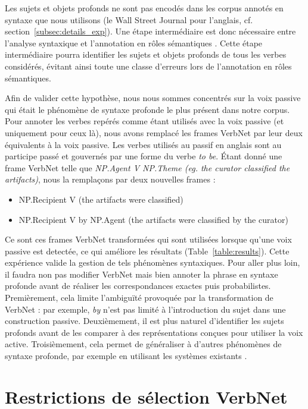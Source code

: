 Les sujets et objets profonds ne sont pas encodés dans les corpus annotés en
syntaxe que nous utilisons (le Wall Street Journal pour l'anglais, cf.
section~\ref{subsec:details_exp}). Une étape intermédiaire est donc nécessaire
entre l'analyse syntaxique et l'annotation en rôles sémantiques
\citep{bonfante2011modular, ribeyre2013systeme}. Cette étape intermédiaire
pourra identifier les sujets et objets profonds de tous les verbes considérés,
évitant ainsi toute une classe d'erreurs lors de l'annotation en rôles
sémantiques. 

Afin de valider cette hypothèse, nous nous sommes concentrés sur la voix
passive qui était le phénomène de syntaxe profonde le plus présent dans notre
corpus.  Pour annoter les verbes repérés comme étant utilisés avec la voix
passive (et uniquement pour ceux là), nous avons remplacé les frames VerbNet
par leur deux équivalents à la voix passive. Les verbes utilisés au passif en
anglais sont au participe passé et gouvernés par une forme du verbe \textit{to
be}. Étant donné une frame VerbNet telle que \textit{NP.Agent V NP.Theme (eg.
the curator classified the artifacts)}, nous la remplaçons par deux nouvelles
frames :

\begin{itemize}
    \item NP.Recipient V (the artifacts were classified)
    \item NP.Recipient V by NP.Agent (the artifacts were classified by the curator)
\end{itemize}

Ce sont ces frames VerbNet transformées qui sont utilisées lorsque qu'une voix
passive est detectée, ce qui améliore les résultats
(Table~\ref{table:results}). Cette expérience valide la gestion de tels
phénomènes syntaxiques. Pour aller plus loin, il faudra non pas modifier
VerbNet mais bien annoter la phrase en syntaxe profonde avant de réaliser les
correspondances exactes puis probabilistes. Premièrement, cela limite
l'ambiguïté provoquée par la transformation de VerbNet : par exemple, \textit{by}
n'est pas limité à l'introduction du sujet dans une construction passive.
Deuxièmement, il est plus naturel d'identifier les sujets profonds avant de les
comparer à des représentations conçues pour utiliser la voix active.
Troisièmement, cela permet de généraliser à d'autres phénomènes de syntaxe
profonde, par exemple en utilisant les systèmes existants
\citep{bonfante2011modular,ribeyre2013systeme}.

\section{Restrictions de sélection VerbNet}
\label{restrictions_selection}


